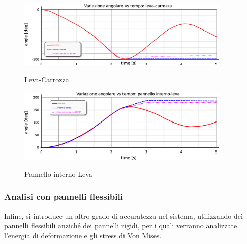 \documentclass{article}
\begin{document}
            \begin{figure}[h!]
                 \label{fig:dinamica_confronto_levacar}
                \centering
                \includegraphics[width=0.9\textwidth]{MUL2/Esercitazione4/dinamica_confronto_leva_carrozza.eps}\\ 
                \caption{Leva-Carrozza}
            \end{figure}

            \begin{figure}[h!]
                 \label{fig:dinamica_confronto_pintleva}
                \centering
                \includegraphics[width=0.9\textwidth]{MUL2/Esercitazione4/dinamica_confronto_pint_leva.eps}
                \caption{Pannello interno-Leva}
            \end{figure}
                
        \clearpage 

        \subsubsection{Analisi con pannelli flessibili \label{analisi_pannelli_flessibili}}

        Infine, si introduce un altro grado di accuratezza nel sistema, utilizzando dei pannelli flessibili
        anziché dei pannelli rigidi, per i quali verranno analizzate l'energia di deformazione e gli stress di Von Mises. 
\end{document}
